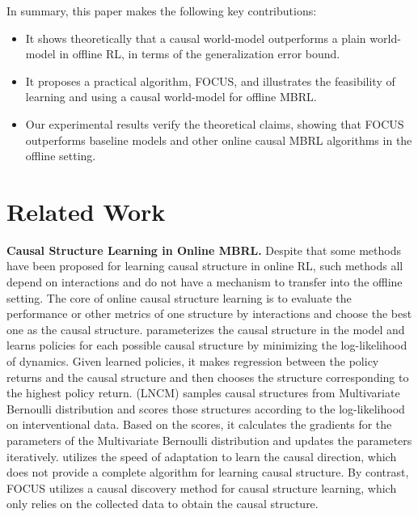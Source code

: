 \documentclass{article}
\theoremstyle{plain}
\theoremstyle{definition}
\theoremstyle{remark}
\begin{document}
In summary, this paper makes the following key contributions:
\begin{itemize}[leftmargin=5mm]
\item It shows theoretically that a causal world-model outperforms a plain world-model in offline RL, in terms of the generalization error bound.
\item It proposes a practical algorithm, FOCUS, and illustrates the feasibility of learning and using a causal world-model for offline MBRL.
\item Our experimental results verify the theoretical claims, showing that FOCUS outperforms baseline models and other online causal MBRL algorithms in the offline setting.
\end{itemize}


\section{Related Work}
\textbf{Causal Structure Learning in Online MBRL.}
Despite that some methods have been proposed for learning causal structure in online RL, such methods all depend on interactions and do not have a mechanism to transfer into the offline setting.
The core of online causal structure learning is to evaluate the performance or other metrics of one structure by interactions and choose the best one as the causal structure.
\cite{DBLP:conf/nips/HaanJL19} parameterizes the causal structure in the model and learns policies for each possible causal structure by minimizing the log-likelihood of dynamics.
Given learned policies, it makes regression between the policy returns and the causal structure and then chooses the structure corresponding to the highest policy return.
\cite{DBLP:journals/corr/abs-1910-01075} (LNCM) samples causal structures from Multivariate Bernoulli distribution and scores those structures according to the log-likelihood on interventional data.
Based on the scores, it calculates the gradients for the parameters of the Multivariate Bernoulli distribution and updates the parameters iteratively.
\cite{DBLP:conf/iclr/BengioDRKLBGP20} utilizes the speed of adaptation to learn the causal direction, which does not provide a complete algorithm for learning causal structure.
By contrast, FOCUS utilizes a causal discovery method for causal structure learning, which only relies on the collected data to obtain the causal structure.
\end{document}
